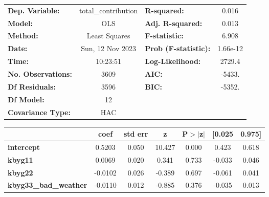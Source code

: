 \begin{center}
\begin{tabular}{lclc}
\toprule
\textbf{Dep. Variable:}                      & total\_contribution & \textbf{  R-squared:         } &     0.016   \\
\textbf{Model:}                              &         OLS         & \textbf{  Adj. R-squared:    } &     0.013   \\
\textbf{Method:}                             &    Least Squares    & \textbf{  F-statistic:       } &     6.908   \\
\textbf{Date:}                               &   Sun, 12 Nov 2023  & \textbf{  Prob (F-statistic):} &  1.66e-12   \\
\textbf{Time:}                               &       10:23:51      & \textbf{  Log-Likelihood:    } &    2729.4   \\
\textbf{No. Observations:}                   &          3609       & \textbf{  AIC:               } &    -5433.   \\
\textbf{Df Residuals:}                       &          3596       & \textbf{  BIC:               } &    -5352.   \\
\textbf{Df Model:}                           &            12       & \textbf{                     } &             \\
\textbf{Covariance Type:}                    &         HAC         & \textbf{                     } &             \\
\bottomrule
\end{tabular}
\begin{tabular}{lcccccc}
                                             & \textbf{coef} & \textbf{std err} & \textbf{z} & \textbf{P$> |$z$|$} & \textbf{[0.025} & \textbf{0.975]}  \\
\midrule
\textbf{intercept}                           &       0.5203  &        0.050     &    10.427  &         0.000        &        0.423    &        0.618     \\
\textbf{kbyg11}                              &       0.0069  &        0.020     &     0.341  &         0.733        &       -0.033    &        0.046     \\
\textbf{kbyg22}                              &      -0.0102  &        0.026     &    -0.389  &         0.697        &       -0.061    &        0.041     \\
\textbf{kbyg33\_bad\_weather}                &      -0.0110  &        0.012     &    -0.885  &         0.376        &       -0.035    &        0.013     \\

\end{tabular}
\end{center}

